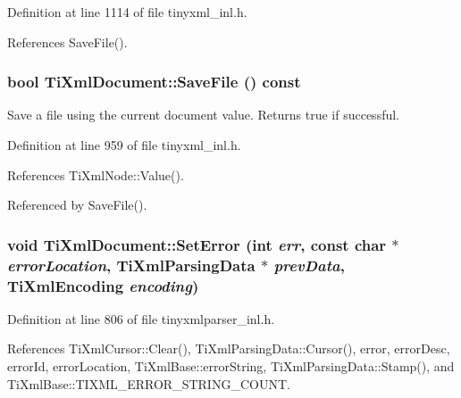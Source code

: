Definition at line 1114 of file tinyxml\_\-inl.h.

References SaveFile().\hypertarget{class_ti_xml_document_a21c0aeb0d0a720169ad4ac89523ebe93}{
\subsubsection[{SaveFile}]{\setlength{\rightskip}{0pt plus 5cm}bool TiXmlDocument::SaveFile () const}}
\label{class_ti_xml_document_a21c0aeb0d0a720169ad4ac89523ebe93}


Save a file using the current document value. Returns true if successful. 

Definition at line 959 of file tinyxml\_\-inl.h.

References TiXmlNode::Value().

Referenced by SaveFile().\hypertarget{class_ti_xml_document_a735c23e318597b920c94eae77fa206de}{
\subsubsection[{SetError}]{\setlength{\rightskip}{0pt plus 5cm}void TiXmlDocument::SetError (int {\em err}, \/  const char $\ast$ {\em errorLocation}, \/  {\bf TiXmlParsingData} $\ast$ {\em prevData}, \/  {\bf TiXmlEncoding} {\em encoding})}}
\label{class_ti_xml_document_a735c23e318597b920c94eae77fa206de}


Definition at line 806 of file tinyxmlparser\_\-inl.h.

References TiXmlCursor::Clear(), TiXmlParsingData::Cursor(), error, errorDesc, errorId, errorLocation, TiXmlBase::errorString, TiXmlParsingData::Stamp(), and TiXmlBase::TIXML\_\-ERROR\_\-STRING\_\-COUNT.

